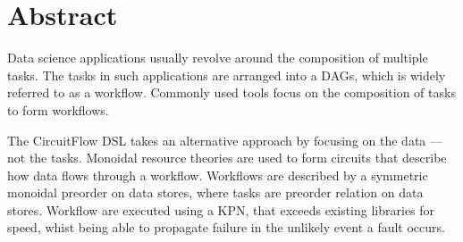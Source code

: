 \documentclass[dissertation.tex]{subfiles}
\begin{document}
\chapter*{Abstract}\label{chap:abstract}

Data science applications usually revolve around the composition of multiple tasks.
The tasks in such applications are arranged into a \acfp{DAG}, which is widely referred to as a workflow.
Commonly used tools focus on the composition of tasks to form workflows.

The CircuitFlow \ac{DSL} takes an alternative approach by focusing on the data --- not the tasks.
Monoidal resource theories are used to form circuits that describe how data flows through a workflow.
Workflows are described by a symmetric monoidal preorder on data stores, where tasks are preorder relation on data stores.
Workflow are executed using a \acf{KPN}, that exceeds existing libraries for speed, whist being able to propagate failure in the unlikely event a fault occurs.






\end{document}
